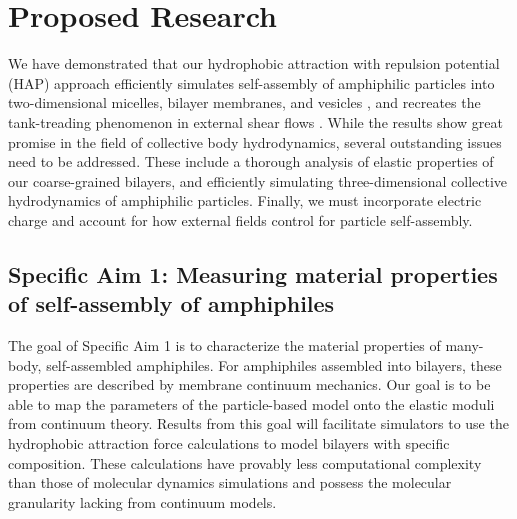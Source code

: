 \section{Proposed Research}
\label{sec:proposed-work}
We have demonstrated that our hydrophobic attraction with repulsion
potential (HAP) approach efficiently simulates self-assembly of
amphiphilic particles into two-dimensional micelles, bilayer membranes,
and vesicles \cite{Fu2018_SIAM}, and recreates the tank-treading
phenomenon in external shear flows \cite{Fu20} .
%
While the results show great promise in the field of collective body
hydrodynamics, several outstanding issues need to be addressed. These
include a thorough analysis of elastic properties of our coarse-grained
bilayers, and efficiently simulating three-dimensional collective
hydrodynamics of amphiphilic particles.
Finally, we must incorporate electric charge and account
for how external fields control for particle self-assembly. 

\subsection{Specific Aim 1: Measuring material properties of self-assembly of amphiphiles}
\label{subsec:specific_aim_1}

The goal of Specific Aim 1 is to characterize the material properties of many-body, self-assembled amphiphiles.
For amphiphiles assembled into bilayers, these properties are described by membrane continuum mechanics.
Our goal is to be able to map the parameters of the particle-based model onto the elastic moduli from continuum theory.
Results from this goal will facilitate simulators to use the hydrophobic attraction force calculations
to model bilayers with specific composition. These calculations have provably less computational complexity than
those of molecular dynamics simulations and possess the molecular granularity lacking from continuum models.

